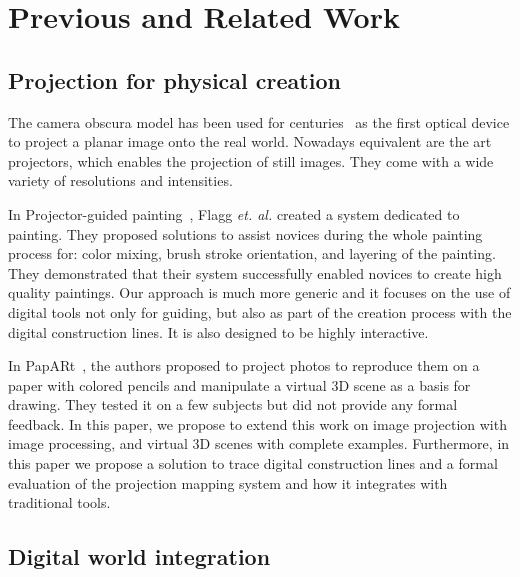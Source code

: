 \documentclass{sigchi}
\begin{document}


%  

\section{Previous and Related Work}




\subsection{Projection for physical creation}

The camera obscura model has been used for
centuries~\cite{gernsheim1969history} as the first optical device to
project a planar image onto the real world. 
Nowadays equivalent are the art projectors, which enables the
projection of still images. They come with a wide variety of
resolutions and intensities.

In Projector-guided painting~\cite{flagg2006projector}, Flagg
\textit{et. al.} created a system dedicated to
painting. They proposed solutions to assist novices during the
whole painting process for: color mixing, brush stroke orientation,
and layering of the painting. They demonstrated that their system
successfully enabled novices to create high quality paintings. 
Our approach is much more generic and it focuses on the use of digital
tools not only for guiding, but also as part of the creation process
with the digital construction lines. It is
also designed to be highly interactive. %


In PapARt~\cite{laviole:2012}, the authors proposed to project photos
to reproduce them on a paper with colored pencils and manipulate a
virtual 3D scene as a basis for drawing. They tested it on a few
subjects but did not provide any formal feedback. 
In this paper, we propose to extend this work on image projection with
image processing, and virtual 3D scenes with complete
examples. Furthermore, in this paper we propose a solution to trace digital
construction lines and a formal evaluation of the projection mapping
system and how it integrates with traditional tools. 
 
\subsection{Digital world integration}
\end{document}
